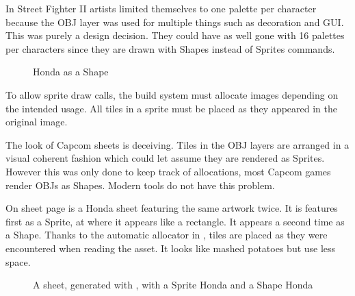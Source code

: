 \begin{trivia}
In Street Fighter II artists limited themselves to one palette per character because the OBJ layer was used for multiple things such as decoration and GUI. This was purely a design decision. They could have as well gone with 16 palettes per characters since they are drawn with Shapes instead of Sprites commands. 
\end{trivia}

 \begin{figure}[H]
\caption*{Honda as a Shape}
\end{figure}


To allow sprite draw calls, the build system must allocate images depending on the intended usage. All tiles in a sprite must be placed as they appeared in the original image.
 

The look of Capcom sheets is deceiving. Tiles in the OBJ layers are arranged in a visual coherent fashion which could let assume they are rendered as Sprites. However this was only done to keep track of allocations, most Capcom games render OBJs as Shapes. Modern tools do not have this problem.

On sheet page \pageref{honda_sheet} is a Honda sheet featuring the same artwork twice. It is features first as a  Sprite, at  where it appears like a rectangle. It appears a second time as a Shape. Thanks to the automatic allocator in , tiles are placed as they were encountered when reading the asset. It looks like mashed potatoes but use less space.

\begin{figure}[H]
\caption*{A sheet, generated with , with a Sprite Honda and a Shape Honda}
\end{figure}
\label{honda_sheet}





